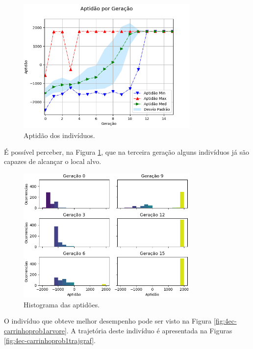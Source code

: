 \begin{figure}[H]
	\centering
	\includegraphics[width=0.8\textwidth]{02_desenvolvimento/04_EC_Fig_CarrinhoProb1AptGer.png}
	\caption{Aptidão dos indivíduos.}
	\label{fig:4ec-carrinhoprob1aptger}
\end{figure}

É possível perceber, na Figura \ref{fig:4ec-carrinhoprob1aptger}, que na terceira geração alguns indivíduos já são capazes de alcançar o local alvo.

\begin{figure}[H]
	\centering
	\includegraphics[width=0.8\textwidth]{02_desenvolvimento/04_EC_Fig_CarrinhoProb1AptHist.png}
	\caption{Histograma das aptidões.}
	\label{fig:4ec-carrinhoprob1apthist}
\end{figure}

O indivíduo que obteve melhor desempenho pode ser visto na Figura \ref{fig:4ec-carrinhoprob1arvore}. A trajetória deste indivíduo é apresentada na Figuras \ref{fig:4ec-carrinhoprob1trajgraf}.

